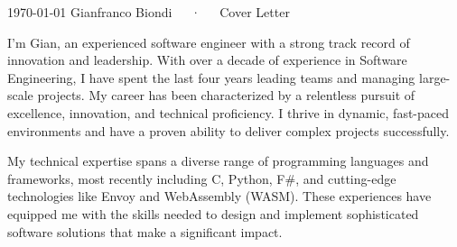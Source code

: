 \documentclass[11pt, a4paper]{awesome-cv}
\begin{document}
\makecvheader[R]

\makecvfooter
{\today}
{Gianfranco Biondi~~~·~~~Cover Letter}
{}

\makelettertitle

\begin{cvletter}

  I'm Gian, an experienced software engineer with a strong track record
  of innovation and leadership. With over a decade of experience in Software
  Engineering, I have spent the last four years leading teams and managing
  large-scale projects. My career has been characterized by a relentless pursuit
  of excellence, innovation, and technical proficiency. I thrive in dynamic,
  fast-paced environments and have a proven ability to deliver complex projects
  successfully.

  My technical expertise spans a diverse range of programming languages and
  frameworks, most recently including C, Python, F{\#}, and cutting-edge technologies like
  Envoy and WebAssembly (WASM). These experiences have equipped me with the
  skills needed to design and implement sophisticated software solutions that
  make a significant impact.




\end{cvletter}
\end{document}
